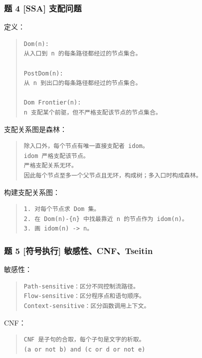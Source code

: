 \documentclass[UTF8,zihao=-4]{ctexart}
\begin{document}
\subsubsection{题 4 [SSA] 支配问题}


定义：


\begin{quote}
\footnotesize
\begin{verbatim}
Dom(n):
从入口到 n 的每条路径都经过的节点集合。

PostDom(n):
从 n 到出口的每条路径都经过的节点集合。

Dom Frontier(n):
n 支配某个前驱，但不严格支配该节点的节点集合。
\end{verbatim}
\end{quote}


支配关系图是森林：


\begin{quote}
\footnotesize
\begin{verbatim}
除入口外，每个节点有唯一直接支配者 idom。
idom 严格支配该节点。
严格支配关系无环。
因此每个节点至多一个父节点且无环，构成树；多入口时构成森林。
\end{verbatim}
\end{quote}


构建支配关系图：


\begin{quote}
\footnotesize
\begin{verbatim}
1. 对每个节点求 Dom 集。
2. 在 Dom(n)-{n} 中找最靠近 n 的节点作为 idom(n)。
3. 画 idom(n) -> n。
\end{verbatim}
\end{quote}


\subsubsection{题 5 [符号执行] 敏感性、CNF、Tseitin}


敏感性：


\begin{quote}
\footnotesize
\begin{verbatim}
Path-sensitive：区分不同控制流路径。
Flow-sensitive：区分程序点和语句顺序。
Context-sensitive：区分函数调用上下文。
\end{verbatim}
\end{quote}


CNF：


\begin{quote}
\footnotesize
\begin{verbatim}
CNF 是子句的合取，每个子句是文字的析取。
(a or not b) and (c or d or not e)
\end{verbatim}
\end{quote}
\end{document}
